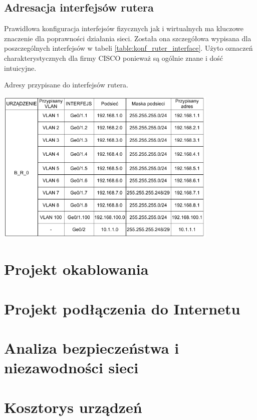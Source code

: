 \documentclass{report}
\begin{document}
\subsection{Adresacja interfejsów rutera}
Prawidłowa konfiguracja interfejsów fizycznych jak i wirtualnych ma kluczowe znaczenie dla poprawności działania sieci. Została ona szczegółowa wypisana
dla poszczególnych interfejsów w tabeli \ref{table:konf_ruter_interface}. Użyto oznaczeń charakterystycznych dla firmy CISCO ponieważ są ogólnie znane i dość 
intuicyjne.
\begin{table}[H]
\caption{Adresy przypisane do interfejsów rutera.}
\label{table:konf_ruter_interface}
 \centering
      \includegraphics[width=0.8\textwidth]{./obrazki/ip/ip_ruter.png}
\end{table}

\section{Projekt okablowania}
\section{Projekt podłączenia do Internetu}
\section{Analiza bezpieczeństwa i niezawodności sieci}
\section{Kosztorys urządzeń}

\end{document}
